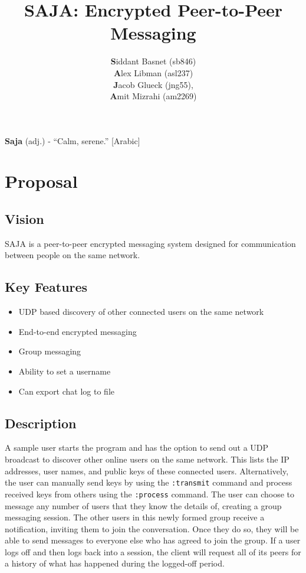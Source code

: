 \documentclass{scrartcl}
\title{SAJA: Encrypted Peer-to-Peer Messaging}
\author{\textbf{S}iddant Basnet (sb846) \\ \textbf{A}lex Libman (asl237)\\ \textbf{J}acob Glueck (jng55), \\ \textbf{A}mit Mizrahi (am2269)}
\date{}
\begin{document}
\maketitle

\textbf{Saja} (adj.) - ``Calm, serene.'' [Arabic]

\section{Proposal}
\subsection{Vision}
SAJA is a peer-to-peer encrypted messaging system designed for communication between people on the same network.

\subsection{Key Features}
\begin{itemize}
	\item UDP based discovery of other connected users on the same network
	\item End-to-end encrypted messaging
	\item Group messaging
	\item Ability to set a username
	\item Can export chat log to file
\end{itemize}

\subsection{Description}
A sample user starts the program and has the option to send out a UDP broadcast to discover other online users on the same network. This lists the IP addresses, user names, and public keys of these connected users. Alternatively, the user can manually send keys by using the \texttt{:transmit} command and process received keys from others using the \texttt{:process} command. The user can choose to message any number of users that they know the details of, creating a group messaging session. The other users in this newly formed group receive a notification, inviting them to join the conversation. Once they do so, they will be able to send messages to everyone else who has agreed to join the group. If a user logs off and then logs back into a session, the client will request all of its peers for a history of what has happened during the logged-off period.
\end{document}

